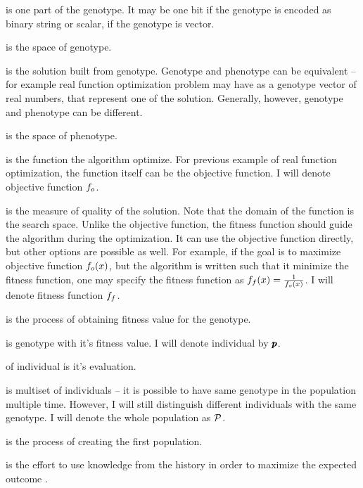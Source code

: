  is one part of the genotype. It may be one bit if the genotype is encoded as binary string or scalar, if the genotype is vector. 

 is the space of genotype.

 is the solution built from genotype. Genotype and phenotype can be equivalent -- for example real function optimization problem may have as a genotype vector of real numbers, that represent one of the solution. Generally, however, genotype and phenotype can be different.

 is the space of phenotype.

 is the function the algorithm optimize. For previous example of real function optimization, the function itself can be the objective function. I will denote objective function $f_o$.

 is the measure of quality of the solution. Note that the domain of the function is the search space. Unlike the objective function, the fitness function should guide the algorithm during the optimization. It can use the objective function directly, but other options are possible as well. For example, if the goal is to maximize objective function $f_o(x)$, but the algorithm is written such that it minimize the fitness function, one may specify the fitness function as $f_f(x)=\frac{1}{f_o(x)}$. I will denote fitness function $f_f$.

 is the process of obtaining fitness value for the genotype.

 is genotype with it's fitness value. I will denote individual by $\pmb{p}$.

 of individual is it's evaluation. 

 is multiset of individuals -- it is possible to have same genotype in the population multiple time. However, I will still distinguish different individuals with the same genotype. I will denote the whole population as $\mathcal{P}$.

 is the process of creating the first population.

 is the effort to use knowledge from the history in order to maximize the expected outcome \citep{SelfAdaptiveFeaturesInRealParameterEvolutionaryAlgorithms}.

